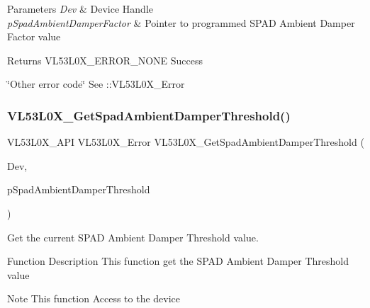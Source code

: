 \begin{DoxyParams}{Parameters}
{\em Dev} & Device Handle \\
\hline
{\em p\+Spad\+Ambient\+Damper\+Factor} & Pointer to programmed S\+P\+AD Ambient Damper Factor value \\
\hline
\end{DoxyParams}
\begin{DoxyReturn}{Returns}
V\+L53\+L0\+X\+\_\+\+E\+R\+R\+O\+R\+\_\+\+N\+O\+NE Success 

\char`\"{}\+Other error code\char`\"{} See \+::\+V\+L53\+L0\+X\+\_\+\+Error 
\end{DoxyReturn}
\mbox{\label{group__VL53L0X__SPADfunctions__group_gab4242560466b011b4932f0df18b5ad1a}} 
\subsubsection{\texorpdfstring{V\+L53\+L0\+X\+\_\+\+Get\+Spad\+Ambient\+Damper\+Threshold()}{VL53L0X\_GetSpadAmbientDamperThreshold()}}
{\footnotesize\ttfamily V\+L53\+L0\+X\+\_\+\+A\+PI V\+L53\+L0\+X\+\_\+\+Error V\+L53\+L0\+X\+\_\+\+Get\+Spad\+Ambient\+Damper\+Threshold (\begin{DoxyParamCaption}\item[{\hyperlink{group__VL53L0X__platform__group_ga2d6405308b1dd524b462f1b8fb97d167}{V\+L53\+L0\+X\+\_\+\+D\+EV}}]{Dev,  }\item[{\hyperlink{vl53l0x__types_8h_a273cf69d639a59973b6019625df33e30}{uint16\+\_\+t} $\ast$}]{p\+Spad\+Ambient\+Damper\+Threshold }\end{DoxyParamCaption})}



Get the current S\+P\+AD Ambient Damper Threshold value. 

\begin{DoxyParagraph}{Function Description}
This function get the S\+P\+AD Ambient Damper Threshold value
\end{DoxyParagraph}
\begin{DoxyNote}{Note}
This function Access to the device
\end{DoxyNote}

